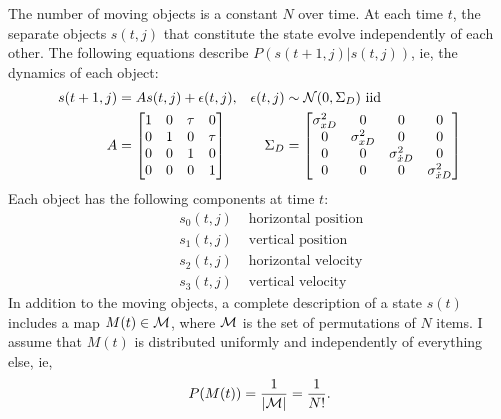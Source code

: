 \documentclass[12pt]{article}
\newcommand{\normal}[2]{{\cal N}(#1,#2)}
\newcommand{\xdot}{{\dot x}}
\newcommand{\M}{{\cal M}}
\newcommand{\ti}[2]{{#1}{(#2)}}                         %
\begin{document}
The number of moving objects is a constant $N$ over time.  At each
time $t$, the separate objects $\ti{s}{t,j}$ that constitute the state
evolve independently of each other.  The following equations describe
$P(\ti{s}{t+1,j}|\ti{s}{t,j})$, ie, the dynamics of each object:
\begin{subequations}
  \label{eq:dynamics}
  \begin{align}
    \ti{s}{t+1,j} &= A  \ti{s}{t,j} + \ti{\epsilon}{t,j}, &
    \ti{\epsilon}{t,j} &\sim \normal{0}{\Sigma_{D}} \text{ iid} \\
    A &= \begin{bmatrix}
      1 & 0 & \tau & 0 \\
      0 & 1 & 0 & \tau \\
      0 & 0 & 1 & 0 \\
      0 & 0 & 0 & 1
    \end{bmatrix} &
    \Sigma_{D} &= \begin{bmatrix}
      \sigma^2_{xD} & 0 & 0 & 0 \\
      0 & \sigma^2_{xD} & 0 & 0 \\
      0 & 0 & \sigma^2_{\xdot D} & 0 \\
      0 & 0 & 0 & \sigma^2_{\xdot D}
    \end{bmatrix}
  \end{align}
\end{subequations}
Each object has the following components at time $t$:
\begin{align*}
  &&s_{0}(t,j) & \text{ horizontal position} \\
  &&s_{1}(t,j) & \text{ vertical position} \\
  &&s_{2}(t,j) & \text{ horizontal velocity} \\
  &&s_{3}(t,j) & \text{ vertical velocity}
\end{align*}
In addition to the moving objects, a complete description of a state
$\ti{s}{t}$ includes a map $\ti{M}{t}\in \M$, where $\M$ is the set of
permutations of $N$ items.  I assume that $\ti{M}{t}$ is distributed
uniformly and independently of everything else, ie,
\begin{equation*}
  P(\ti{M}{t}) = \frac{1}{\left| \M\right|} =  \frac{1}{N!}.
\end{equation*}
\end{document}
